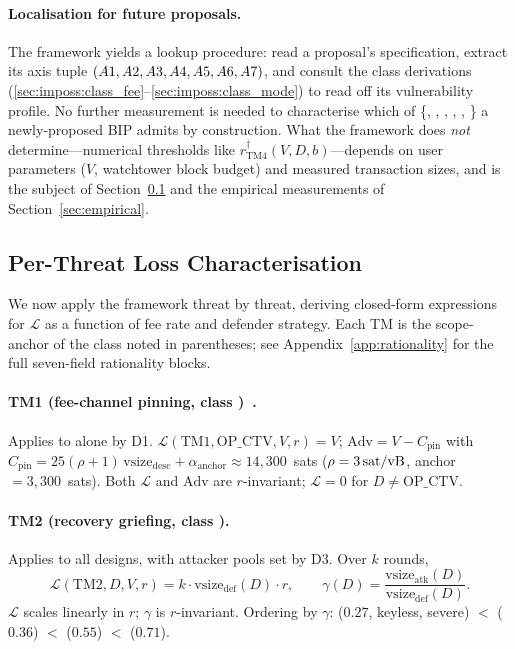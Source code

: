 \paragraph{Localisation for future proposals.}
The framework yields a lookup procedure: read a proposal's
specification, extract its axis tuple
$(A1, A2, A3, A4, A5, A6, A7)$,
and consult the class derivations
(\ref{sec:imposs:class_fee}--\ref{sec:imposs:class_mode}) to read
off its vulnerability profile. No further measurement is needed to
characterise which of \{\classfee{}, \classgrief{}, \classscale{},
\classhot{}, \classcold{}, \classmode{}\} a newly-proposed BIP
admits by construction. What the framework does \emph{not}
determine---numerical thresholds like $r^\dagger_{\mathrm{TM4}}(V,
D, b)$---depends on user parameters ($V$, watchtower block budget)
and measured transaction sizes, and is the subject of
Section~\ref{sec:imposs:sensitivity} and the empirical measurements
of Section~\ref{sec:empirical}.

\subsection{Per-Threat Loss Characterisation}
\label{sec:imposs:sensitivity}

We now apply the framework threat by threat, deriving closed-form
expressions for $\mathcal{L}$ as a function of fee rate and
defender strategy. Each TM is the scope-anchor of the class noted in
parentheses; see Appendix~\ref{app:rationality} for the full
seven-field rationality blocks.

\paragraph{TM1 (fee-channel pinning, class \classfee{})~\cite{Har24}.}\label{sec:sens:tm1}
Applies to \opctv{} alone by D1.
$\mathcal{L}(\mathrm{TM1}, \mathrm{OP\_CTV}, V, r) = V$;
$\mathrm{Adv} = V - C_{\text{pin}}$ with
$C_{\text{pin}} = 25(\rho+1)\,\text{vsize}_{\text{desc}} + \alpha_{\text{anchor}}
\approx 14{,}300$~sats ($\rho = 3\text{\,sat/vB}$, anchor $= 3{,}300$~sats).
Both $\mathcal{L}$ and $\mathrm{Adv}$ are $r$-invariant;
$\mathcal{L} = 0$ for $D \neq \mathrm{OP\_CTV}$.

\paragraph{TM2 (recovery griefing, class \classgrief{}).}
Applies to all designs, with attacker pools set by D3. Over $k$
rounds,
\begin{equation} \label{eq:gamma}
  \mathcal{L}(\mathrm{TM2}, D, V, r) = k \cdot \text{vsize}_{\text{def}}(D) \cdot r,
  \qquad
  \gamma(D) = \frac{\text{vsize}_{\text{atk}}(D)}{\text{vsize}_{\text{def}}(D)}.
\end{equation}
$\mathcal{L}$ scales linearly in $r$; $\gamma$ is $r$-invariant.
Ordering by $\gamma$: \opccv{} ($0.27$, keyless, severe) $<$ \catcsfs{}
($0.36$) $<$ \opvault{} ($0.55$) $<$ \opctv{} ($0.71$).


